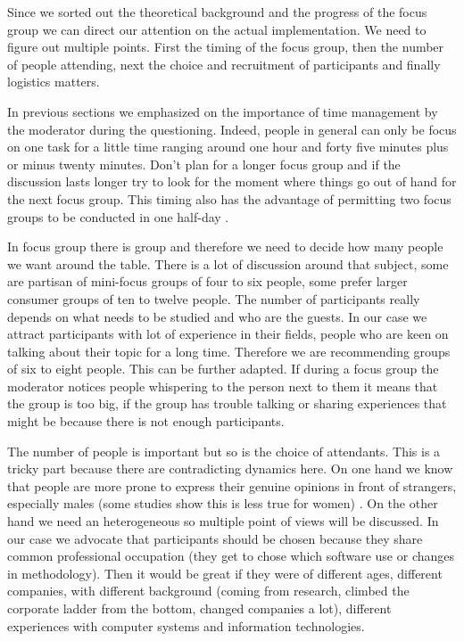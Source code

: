 \documentclass[10pt]{report}
\begin{document}
Since we sorted out the theoretical background and the progress of the focus group we can direct our attention on the actual implementation. We need to figure out multiple points. First the timing of the focus group, then the number of people attending, next the choice and recruitment of participants and finally logistics matters.

In previous sections we emphasized on the importance of time management by the moderator during the questioning. Indeed, people in general can only be focus on one task for a little time ranging around one hour and forty five minutes plus or minus twenty minutes. Don't plan for a longer focus group and if the discussion lasts longer try to look for the moment where things go out of hand for the next focus group. This timing also has the advantage of permitting two focus groups to be conducted in one half-day \autocite{belk2007handbook}.

In focus group there is group and therefore we need to decide how many people we want around the table. There is a lot of discussion around that subject, some are partisan of mini-focus groups of four to six people, some prefer larger consumer groups of ten to twelve people. The number of participants really depends on what needs to be studied and who are the guests. In our case we attract participants with lot of experience in their fields, people who are keen on talking about their topic for a long time. Therefore we are recommending groups of six to eight people. This can be further adapted. If during a focus group the moderator notices people whispering to the person next to them it means that the group is too big, if the group has trouble talking or sharing experiences that might be because there is not enough participants.

The number of people is important but so is the choice of attendants. This is a tricky part because there are contradicting dynamics here. On one hand we know that people are more prone to express their genuine opinions in front of strangers, especially males (some studies show this is less true for women) \autocite{belk2007handbook}. On the other hand we need an heterogeneous so multiple point of views will be discussed. In our case we advocate that participants should be chosen because they share common professional occupation (they get to chose which software use or changes in methodology). Then it would be great if they were of different ages, different companies, with different background (coming from research, climbed the corporate ladder from the bottom, changed companies a lot), different experiences with computer systems and information technologies.
\end{document}
